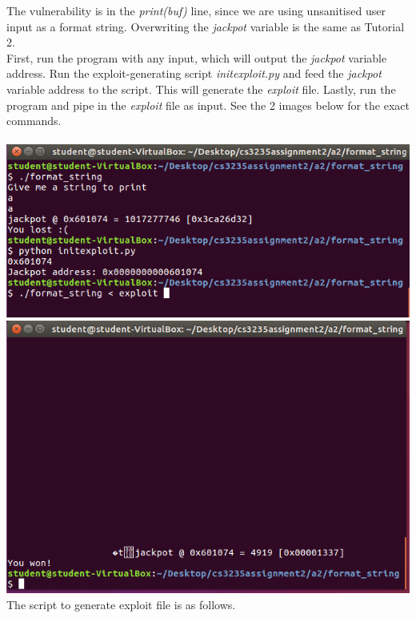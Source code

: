 \documentclass[12pt]{article}
\begin{document}
The vulnerability is in the \emph{print(buf)} line, since we are using unsanitised user input as a format string. Overwriting the \emph{jackpot} variable is the same as Tutorial 2.\\

First, run the program with any input, which will output the \emph{jackpot} variable address.
Run the exploit-generating script \emph{initexploit.py} and feed the \emph{jackpot} variable address to the script.
This will generate the \emph{exploit} file.
Lastly, run the program and pipe in the \emph{exploit} file as input. See the 2 images below for the exact commands.\\\\

\includegraphics[scale=1]{./a2/format_string/result1.PNG}\\
\includegraphics[scale=1]{./a2/format_string/result2.PNG}\\

The script to generate exploit file is as follows.\\\\
\end{document}
